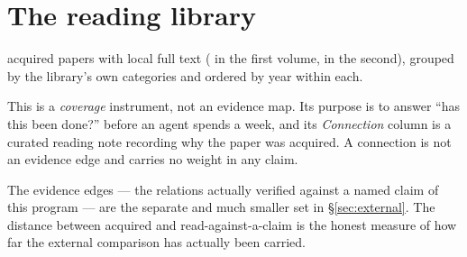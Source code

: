 \section{The reading library}
\label{app:library}

\LibraryPapers{} acquired papers with local full text
(\LibraryVolOne{} in the first volume, \LibraryVolTwo{} in the second),
grouped by the library's own categories and ordered by year within
each.

This is a \emph{coverage} instrument, not an evidence map. Its purpose
is to answer ``has this been done?'' before an agent spends a week, and
its \emph{Connection} column is a curated reading note recording why
the paper was acquired. A connection is not an evidence edge and
carries no weight in any claim.

The evidence edges --- the \LitVerified{} relations actually verified
against a named claim of this program --- are the separate and much
smaller set in \S\ref{sec:external}. The distance between
\LibraryPapers{} acquired and \LitObtained{} read-against-a-claim is
the honest measure of how far the external comparison has actually
been carried.


